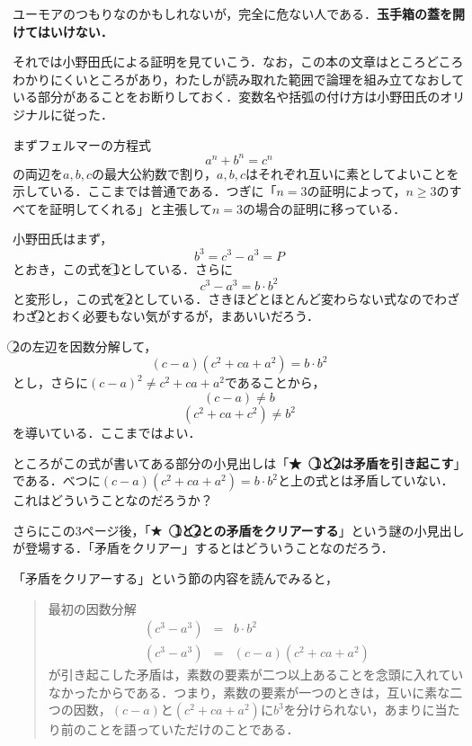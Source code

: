ユーモアのつもりなのかもしれないが，完全に危ない人である．\textbf{玉手箱の蓋を開けてはいけない．}

それでは小野田氏による証明を見ていこう．なお，この本の文章はところどころわかりにくいところがあり，わたしが読み取れた範囲で論理を組み立てなおしている部分があることをお断りしておく．変数名や括弧の付け方は小野田氏のオリジナルに従った．

まずフェルマーの方程式
\[a^n+b^n=c^n\]
の両辺を$a,b,c$の最大公約数で割り，$a,b,c$はそれぞれ互いに素としてよいことを示している．ここまでは普通である．つぎに「$n=3$の証明によって，$n\geq 3$のすべてを証明してくれる」と主張して$n=3$の場合の証明に移っている．



小野田氏はまず，
\[b^3=c^3-a^3=P\]
とおき，この式を\textcircled{\scriptsize 1}としている．さらに
\[c^3-a^3=b\cdot b^2\]
と変形し，この式を\textcircled{\scriptsize 2}としている．さきほどとほとんど変わらない式なのでわざわざ\textcircled{\scriptsize 2}とおく必要もない気がするが，まあいいだろう．

\textcircled{\scriptsize 2}の左辺を因数分解して，
\[(c-a)(c^2+ca+a^2)=b\cdot b^2\]
とし，さらに$(c-a)^2 \neq c^2+ca+a^2$であることから，
\[(c-a)\neq b\]
\[(c^2+ca+c^2)\neq b^2\]
を導いている．ここまではよい．

ところがこの式が書いてある部分の小見出しは「\textbf{★　\textcircled{\scriptsize 1}と\textcircled{\scriptsize 2}は矛盾を引き起こす}」である．べつに$(c-a)(c^2+ca+a^2)=b\cdot b^2$と上の式とは矛盾していない．これはどういうことなのだろうか？

さらにこの3ページ後，「\textbf{★　\textcircled{\scriptsize 1}と\textcircled{\scriptsize 2}との矛盾をクリアーする}」という謎の小見出しが登場する．「矛盾をクリアー」するとはどういうことなのだろう．

「矛盾をクリアーする」という節の内容を読んでみると，

\begin{quote}
最初の因数分解
\begin{eqnarray*}
(c^3-a^3)&=&b\cdot b^2\\
(c^3-a^3)&=&(c-a)(c^2+ca+a^2)
\end{eqnarray*}
が引き起こした矛盾は，素数の要素が二つ以上あることを念頭に入れていなかったからである．つまり，素数の要素が一つのときは，互いに素な二つの因数，$(c-a)$と$(c^2+ca+a^2)$に$b^3$を分けられない，あまりに当たり前のことを語っていただけのことである．
\end{quote}

